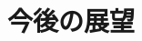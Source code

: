 \documentclass[../main]{subfiles}
\begin{document}
\section{今後の展望}
\label{sec:conc_future}
\end{document}
